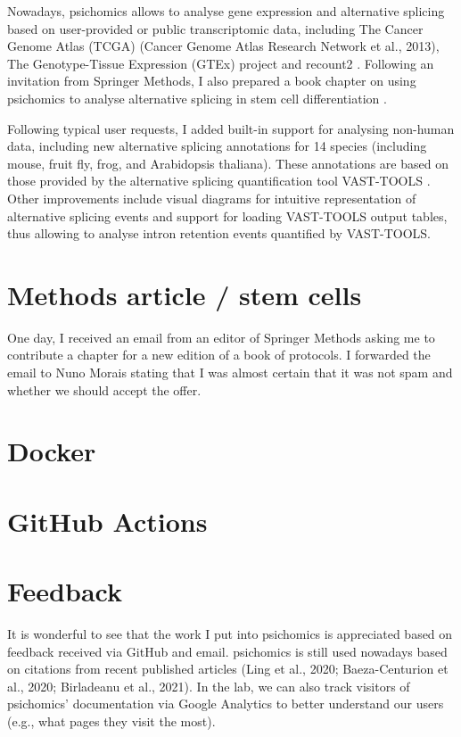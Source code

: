 Nowadays, psichomics allows to analyse gene expression and alternative splicing based on user-provided or public transcriptomic data, including The Cancer Genome Atlas (TCGA) (Cancer Genome Atlas Research Network et al., 2013), The Genotype-Tissue Expression (GTEx) project \cite{lonsdale:2013uo} and recount2 \cite{collado-torres:2017uw}. Following an invitation from Springer Methods, I also prepared a book chapter on using psichomics to analyse alternative splicing in stem cell differentiation \cite{saraiva-agostinho:2020ue}.

Following typical user requests, I added built-in support for analysing non-human data, including new alternative splicing annotations for 14 species (including mouse, fruit fly, frog, and Arabidopsis thaliana). These annotations are based on those provided by the alternative splicing quantification tool VAST-TOOLS \cite{irimia:2014wt,tapial:2017ui}. Other improvements include visual diagrams for intuitive representation of alternative splicing events and support for loading VAST-TOOLS output tables, thus allowing to analyse intron retention events quantified by VAST-TOOLS.

\section{Methods article / stem cells}

One day, I received an email from an editor of Springer Methods asking me to contribute a chapter for a new edition of a book of protocols. I forwarded the email to Nuno Morais stating that I was almost certain that it was not spam and whether we should accept the offer.

\section{Docker}

\section{GitHub Actions}

\section{Feedback}

It is wonderful to see that the work I put into psichomics is appreciated based on feedback received via GitHub and email. psichomics is still used nowadays based on citations from recent published articles (Ling et al., 2020; Baeza-Centurion et al., 2020; Birladeanu et al., 2021). In the lab, we can also track visitors of psichomics’ documentation via Google Analytics to better understand our users (e.g., what pages they visit the most).
